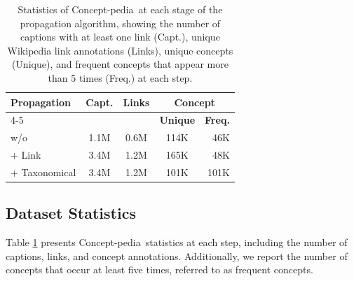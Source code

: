 \documentclass[11pt]{article}
\newcommand{\resource}{Concept-pedia}
\begin{document}
\begin{table}[t]
\centering
\setlength{\tabcolsep}{4pt}
\begin{tabular}{l|cccr}
    \toprule
    \textbf{Propagation} & \textbf{Capt.} & \textbf{Links} & \multicolumn{2}{c}{\textbf{Concept}}  \\
    \cmidrule(lr){4-5} 
    
     &  & & \textbf{Unique} & \textbf{Freq.} \\
    \midrule
    w/o  & 1.1M & 0.6M &  114K & 46K \\ 
    + Link & 3.4M & 1.2M & 165K & 48K \\
    + Taxonomical & 3.4M & 1.2M & 101K & 101K \\
    \bottomrule
\end{tabular}
\caption{Statistics of \resource~at each stage of the propagation algorithm, showing the number of captions with at least one link (Capt.), unique Wikipedia link annotations (Links), unique concepts (Unique), and frequent concepts that appear more than 5 times (Freq.) at each step.}
\label{table:new_stats}
\end{table}

\subsection{Dataset Statistics}
Table \ref{table:new_stats} presents \resource~statistics at each step, including the number of captions, links, and concept annotations. Additionally, we report the number of concepts that occur at least five times, referred to as frequent concepts. 
\end{document}
